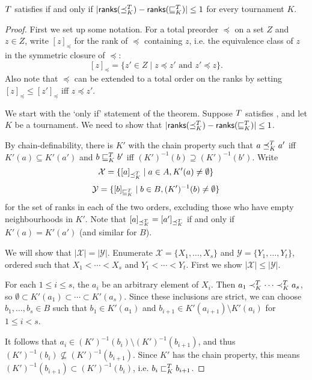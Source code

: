 \begin{theorem}
    \label{tourn_result_chain_def_ranks_characterisation}

    $T$ satisfies \chaindef{} if and only if $|\mathsf{ranks}({\preceq_K^T})
    - \mathsf{ranks}({\sqsubseteq_K^T})| \le 1$ for every tournament $K$.
\end{theorem}

\begin{proof}

    First we set up some notation. For a total preorder $\preceq$ on a set $Z$
    and $z \in Z$, write $[z]_{\preceq}$ for the rank of ${\preceq}$ containing
    $z$, i.e. the equivalence class of $z$ in the symmetric closure of
    ${\preceq}$:
    \[
        [z]_{\preceq}
        = \{z' \in Z \mid z \preceq z' \text{ and } z' \preceq z\}.
    \]
    Also note that $\preceq$ can be extended to a total order on the ranks by
    setting $[z]_{\preceq} \le [z']_{\preceq}$ iff $z \preceq z'$.

    We start with the `only if' statement of the theorem. Suppose
    $T$ satisfies \chaindef{}, and let $K$ be a tournament. We need
    to show that $|\mathsf{ranks}({\preceq_K^T}) - \mathsf{ranks}({\sqsubseteq_K^T})| \le 1$.

    By chain-definability, there is $K'$ with the chain property such that $a
    \preceq_K^T a'$ iff $K'(a) \subseteq K'(a')$ and $b \sqsubseteq_K^T b'$ iff
    $(K')^{-1}(b) \supseteq (K')^{-1}(b')$. Write
    \[ \mathcal{X} = \{ [a]_{\preceq_K^T} \mid a \in A, K'(a) \ne \emptyset \} \]
    \[ \mathcal{Y} = \{ [b]_{\sqsubseteq_K^T} \mid b \in B, (K')^{-1}(b) \ne \emptyset \} \]
    for the set of ranks in each of the two orders, excluding those who have
    empty neighbourhoods in $K'$. Note that $[a]_{\preceq_K^T} =
    [a']_{\preceq_K^T}$ if and only if $K'(a) = K'(a')$ (and similar for $B$).

    We will show that $|\mathcal{X}| = |\mathcal{Y}|$. Enumerate $\mathcal{X} =
    \{X_1,\ldots,X_s\}$ and $\mathcal{Y} = \{Y_1,\ldots,Y_t\}$, ordered such
    that $X_1 < \cdots < X_s$ and $Y_1 < \cdots < Y_t$. First we show
    $|\mathcal{X}| \le |\mathcal{Y}|$.

    For each $1 \le i \le s$, the $a_i$ be an arbitrary element of $X_i$. Then
    $a_1 \prec_K^T \cdots \prec_K^T a_s$, so $\emptyset \subset K'(a_1)
    \subset \cdots \subset K'(a_s)$. Since these inclusions are strict, we can
    choose $b_1,\ldots,b_s \in B$ such that $b_1 \in K'(a_1)$ and $b_{i+1} \in
    K'(a_{i+1}) \setminus K'(a_i)$ for $1 \le i < s$.

    It follows that $a_i \in (K')^{-1}(b_i) \setminus (K')^{-1}(b_{i+1})$, and
    thus $(K')^{-1}(b_i) \not\subseteq (K')^{-1}(b_{i+1})$. Since $K'$ has
    the chain property, this means $(K')^{-1}(b_{i+1}) \subset
    (K')^{-1}(b_i)$, i.e. $b_i \sqsubset_K^T b_{i+1}$.


\end{proof}
